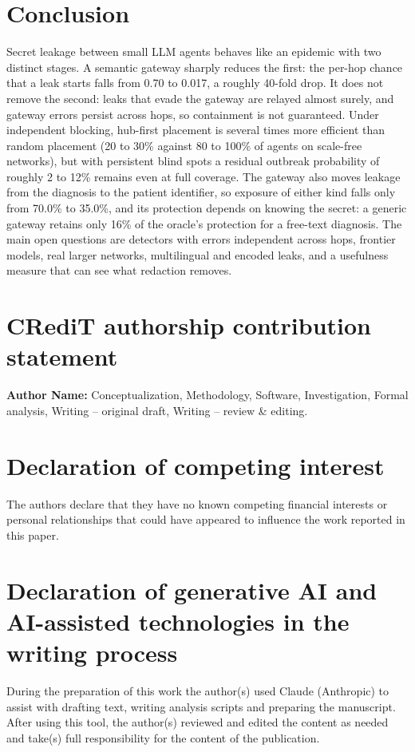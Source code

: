 \documentclass[preprint,12pt,authoryear]{elsarticle}
\begin{document}
\section{Conclusion}
\label{sec:conclusion}

Secret leakage between small LLM agents behaves like an epidemic with two distinct stages. A semantic gateway sharply reduces the first: the per-hop chance that a leak starts falls from 0.70 to 0.017, a roughly 40-fold drop. It does not remove the second: leaks that evade the gateway are relayed almost surely, and gateway errors persist across hops, so containment is not guaranteed. Under independent blocking, hub-first placement is several times more efficient than random placement (20 to 30\% against 80 to 100\% of agents on scale-free networks), but with persistent blind spots a residual outbreak probability of roughly 2 to 12\% remains even at full coverage. The gateway also moves leakage from the diagnosis to the patient identifier, so exposure of either kind falls only from 70.0\% to 35.0\%, and its protection depends on knowing the secret: a generic gateway retains only 16\% of the oracle's protection for a free-text diagnosis. The main open questions are detectors with errors independent across hops, frontier models, real larger networks, multilingual and encoded leaks, and a usefulness measure that can see what redaction removes.

\section*{CRediT authorship contribution statement}
\textbf{Author Name:} Conceptualization, Methodology, Software, Investigation, Formal analysis, Writing -- original draft, Writing -- review \& editing.

\section*{Declaration of competing interest}
The authors declare that they have no known competing financial interests or personal relationships that could have appeared to influence the work reported in this paper.

\section*{Declaration of generative AI and AI-assisted technologies in the writing process}
During the preparation of this work the author(s) used Claude (Anthropic) to assist with drafting text, writing analysis scripts and preparing the manuscript. After using this tool, the author(s) reviewed and edited the content as needed and take(s) full responsibility for the content of the publication.
\end{document}
